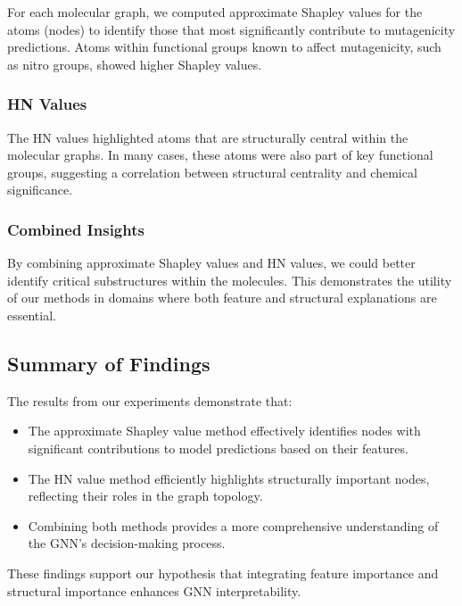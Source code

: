 \documentclass{article}
\begin{document}
For each molecular graph, we computed approximate Shapley values for the atoms (nodes) to identify those that most significantly contribute to mutagenicity predictions. Atoms within functional groups known to affect mutagenicity, such as nitro groups, showed higher Shapley values.

\subsubsection{HN Values}

The HN values highlighted atoms that are structurally central within the molecular graphs. In many cases, these atoms were also part of key functional groups, suggesting a correlation between structural centrality and chemical significance.

\subsubsection{Combined Insights}

By combining approximate Shapley values and HN values, we could better identify critical substructures within the molecules. This demonstrates the utility of our methods in domains where both feature and structural explanations are essential.

\subsection{Summary of Findings}

The results from our experiments demonstrate that:

\begin{itemize}
    \item The approximate Shapley value method effectively identifies nodes with significant contributions to model predictions based on their features.
    \item The HN value method efficiently highlights structurally important nodes, reflecting their roles in the graph topology.
    \item Combining both methods provides a more comprehensive understanding of the GNN's decision-making process.
\end{itemize}

These findings support our hypothesis that integrating feature importance and structural importance enhances GNN interpretability.
\end{document}
